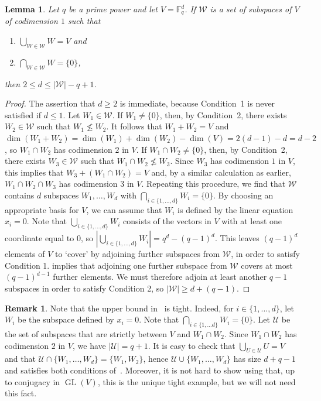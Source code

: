 \documentclass[11pt,a4paper]{amsart}
\newtheorem{lemma}[theorem]{Lemma}
\theoremstyle{definition}
\newtheorem{remark}[theorem]{Remark}
\DeclareMathOperator{\GL}{GL}
\begin{document}
\begin{lemma}\label{DerangementsInPGroups2}
Let $q$ be a prime power and let $V = \mathbb{F}_q^d$. 
If $\mathcal{W}$ is a set of subspaces of $V$ of codimension $1$ such that 
\begin{enumerate}
\item $\bigcup_{W\in \mathcal{W}} W = V$ and 
\item $\bigcap_{W\in \mathcal{W}} W = \{0\}$,
\end{enumerate}
then $2 \leq d \leq |\mathcal{W}|-q+1$.
\end{lemma}
\begin{proof}
The assertion that $d \geq 2$ is immediate, because Condition~1 is never satisfied if $d\leq 1$. Let $W_1\in \mathcal{W}$. If $W_1\neq \{0\}$, then, by Condition~2, there exists $W_2\in \mathcal{W}$ such that $W_1\nleq W_2$. It follows that $W_1+W_2=V$ and $\dim(W_1+W_2)=\dim(W_1)+\dim(W_2)-\dim(V)=2(d-1)-d=d-2$, so $W_1\cap W_2$ has codimension $2$ in $V$. If $W_1\cap W_2\neq \{0\}$, then, by Condition~2, there exists $W_3\in \mathcal{W}$ such that $W_1\cap W_2\nleq W_3$. Since $W_3$ has codimension $1$ in $V$, this implies that $W_3+(W_1\cap W_2)=V$ and, by a similar calculation as earlier, $W_1\cap W_2\cap W_3$ has codimension $3$ in $V$. Repeating this procedure, we find that $\mathcal{W}$ contains $d$ subspaces $W_1,\ldots,W_d$ with $\bigcap_{i\in \{1,\ldots,d\}} W_i = \{0\}$. By choosing an appropriate basis for $V$, we can assume that $W_i$ is defined by the linear equation $x_i=0$. Note that  $\bigcup_{i\in\{1,\ldots,d\} } W_i$ consists of the vectors in $V$ with at least one coordinate equal to $0$, so $|\bigcup_{i\in\{1,\ldots,d\} } W_i|=q^d-(q-1)^d$. This leaves $(q-1)^d$ elements of $V$ to `cover' by adjoining further subspaces from $\mathcal{W}$, in order to satisfy Condition 1.  implies that adjoining one further subspace from $\mathcal{W}$ covers at most $(q-1)^{d-1}$ further elements.  We must therefore adjoin at least another $q-1$ subspaces in order to satisfy Condition 2, so $|\mathcal{W}| \geq d + (q-1)$.
\end{proof}

\begin{remark}
Note that the upper bound in~ is tight. Indeed, for $i\in\{1,\ldots, d\}$, let $W_i$ be the subspace defined by $x_i=0$. Note that $\bigcap_{i\in\{1,\ldots d\}} W_i = \{0\}$. Let $\mathcal{U}$ be the set of subspaces that are strictly between $V$ and $W_1\cap W_2$. Since $W_1\cap W_2$ has codimension $2$ in $V$, we have $|\mathcal{U}|=q+1$. It is easy to check that $\bigcup_{U\in \mathcal{U}} U = V$ and that $\mathcal{U} \cap \{W_1,\ldots,W_d\}=\{W_1,W_2\}$, hence $\mathcal{U} \cup \{W_1,\ldots,W_d\}$ has size $d+q-1$ and satisfies both conditions of~. Moreover, it is not hard to show using  that, up to conjugacy in $\GL(V)$, this is the unique tight example, but we will not need this fact.
\end{remark}
\end{document}

